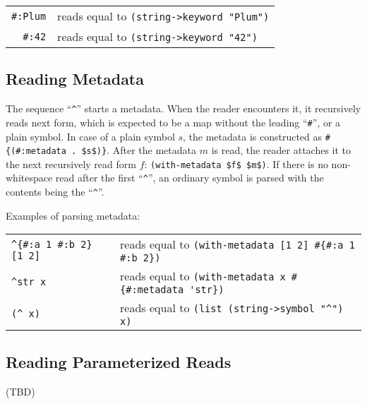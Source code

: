 \begin{tabular}{ r l }
  \lstinline!#:Plum! & reads equal to \lstinline!(string->keyword "Plum")! \\
  \lstinline!#:42! & reads equal to \lstinline!(string->keyword "42")! \\
\end{tabular}





\subsection{Reading Metadata}
\label{subsec:aml-base-lang-reader-metadata}

The sequence ``\lstinline!^!'' starts a metadata. When the reader encounters it, it recursively reads next form, which is expected to be a map without the leading ``\lstinline!#!'', or a plain symbol. In case of a plain symbol $s$, the metadata is constructed as \lstinline!#{(#:metadata . $s$)}!. After the metadata $m$ is read, the reader attaches it to the next recursively read form $f$\thinspace: \lstinline!(with-metadata $f$ $m$)!. If there is no non-whitespace read after the first ``\lstinline!^!'', an ordinary symbol is parsed with the contents being the ``\lstinline!^!''.

\example Examples of parsing metadata:

\begin{tabular}{ l l }
  \lstinline!^{#:a 1 #:b 2} [1 2]! & reads equal to \lstinline!(with-metadata [1 2] #{#:a 1 #:b 2})! \\
  \lstinline!^str x! & reads equal to \lstinline!(with-metadata x #{#:metadata 'str})! \\
  \lstinline!(^ x)! & reads equal to \lstinline!(list (string->symbol "^") x)! \\
\end{tabular}






\subsection{Reading Parameterized Reads}
\label{subsec:aml-base-lang-reader-parameterized-reads}


(TBD)





